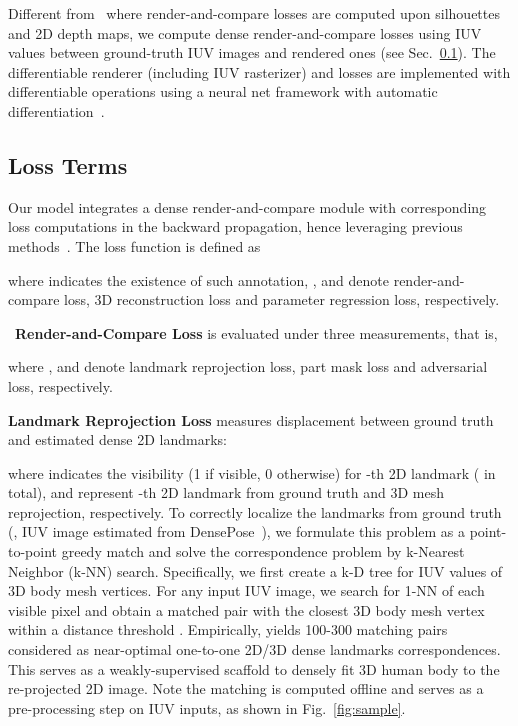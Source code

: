 \documentclass[10pt,twocolumn,letterpaper]{article}
\newcommand{\beforesubsection}{\vspace{0mm}}
\newcommand{\aftersubsection}{\vspace{0mm}}
\begin{document}
Different from~\cite{tung2017self,Kundu18RenderCompare} where render-and-compare losses are computed upon silhouettes and 2D depth maps, we compute dense render-and-compare losses  using IUV values between ground-truth IUV images and rendered ones (see Sec.~\ref{sec:lossterms}).
The differentiable renderer (including IUV rasterizer) and losses are implemented with differentiable operations using a neural net framework with automatic differentiation~\cite{Dayan95AlySyn,tung2017self,Kundu18RenderCompare}.

\beforesubsection
\subsection{Loss Terms} \label{sec:lossterms}
\aftersubsection

Our model integrates a dense render-and-compare module with corresponding loss computations in the backward propagation, hence leveraging previous methods~\cite{pavlakos2018ps,kanazawa2018hmr,NeuralBodyFit18,varol18_bodynet}.
The loss function is defined as

where  indicates the existence of such annotation, ,  and  denote render-and-compare loss, 3D reconstruction loss and parameter regression loss, respectively.

\noindent {\small \textbullet} \, \textbf{Render-and-Compare Loss}  is evaluated under three measurements, that is,

where ,  and  denote landmark reprojection loss, part mask loss and adversarial loss, respectively.

\textbf{Landmark Reprojection Loss}  measures displacement between ground truth and estimated dense 2D landmarks: 

where  indicates the visibility (1 if visible, 0 otherwise) for -th 2D landmark ( in total),
 and  represent -th 2D landmark from ground truth and 3D mesh reprojection, respectively.
To correctly localize the landmarks from ground truth (\ie, IUV image estimated from DensePose~\cite{DensePose2018}), we formulate this problem as a point-to-point greedy match and solve the correspondence problem by k-Nearest Neighbor (k-NN) search. 
Specifically, we first create a k-D tree for IUV values of 3D body mesh vertices.
For any input IUV image, we search for 1-NN of each visible pixel and obtain a matched pair with the closest 3D body mesh vertex within a distance threshold .
Empirically,  yields 100-300 matching pairs considered as near-optimal one-to-one 2D/3D dense landmarks correspondences.
This serves as a weakly-supervised scaffold to densely fit 3D human body to the re-projected 2D image. Note the matching is computed offline and serves as a pre-processing step on IUV inputs, as shown in Fig.~\ref{fig:sample}.
\end{document}
